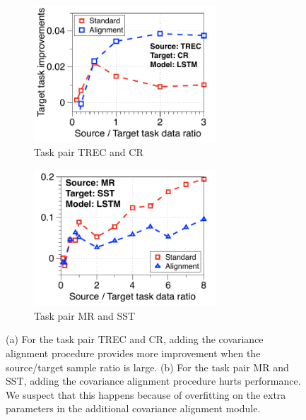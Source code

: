 \begin{figure}[!h]
	\centering
	\begin{subfigure}[b]{0.48\textwidth}
		\centering
		\includegraphics[width=0.75\textwidth]{figures/ratio_alignment_norm_trec_cr_lstm.pdf}
		\caption{Task pair TREC and CR}
		\label{fig_cov_a}
	\end{subfigure}\hfill
		\begin{subfigure}[b]{0.48\textwidth}
		\centering
		\includegraphics[width=0.75\textwidth]{figures/ratio_alignment_mr_sst_lstm.pdf}
		\caption{Task pair MR and SST}
			\label{fig_cov_b}
	\end{subfigure}
	\caption{(a) For the task pair TREC and CR, adding the covariance alignment procedure provides more improvement when the source/target sample ratio is large.
	(b) For the task pair MR and SST, adding the covariance alignment procedure hurts performance. We suspect that this happens because of overfitting on the extra parameters in the additional covariance alignment module.}
	\label{fig_covariate_app}
\end{figure}
